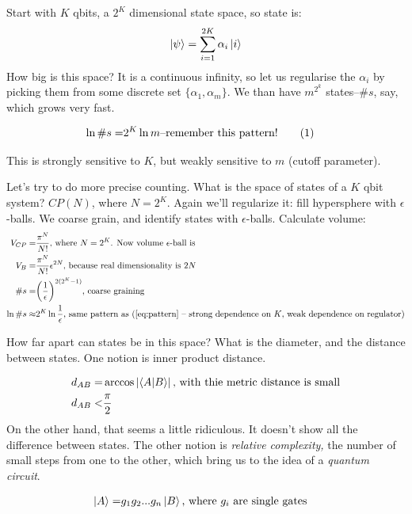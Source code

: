 \documentclass[]{article}
\newcommand\numberthis{\addtocounter{equation}{1}\tag{\theequation}}
\begin{document}
Start with $K$ qbits,  a $2^K$ dimensional state space, so state is:
\begin{align*}
	\ket{\psi}=\sum_{i=1}^{2K}\alpha_i \ket{i}
\end{align*}
How big is this space? It is a continuous infinity, so let us regularise the $\alpha_i$ by picking them from some discrete set $\{\alpha_1, \alpha_m\}$. We than have $m^{2^k}$ states--$\#s$, say, which grows very fast.

\begin{align*}
	\ln \#s =& 2^K \ln m \text{--remember this pattern!} \numberthis \label{eq:pattern}
\end{align*}

This is strongly sensitive to $K$, but weakly sensitive to $m$ (cutoff parameter).

Let's try to do more precise counting. What is the space of states of a $K$ qbit system? $CP(N)$, where $N=2^K$. Again we'll regularize it: fill hypersphere with $\epsilon$-balls. We coarse grain, and identify states with $\epsilon$-balls. Calculate volume:
\begin{align*}
	V_{CP}=& \frac{\pi^N}{N!} \text{, where $N=2^K$. Now volume $\epsilon$-ball is}\\
	V_B =& \frac{\pi^N}{N!} \epsilon^{2N} \text{, because real dimensionality is $2N$}\\
	\#s =& \bigg(\frac{1}{\epsilon}\bigg)^{2(2^K-1)} \text{, coarse graining}\\
	\ln \#s \approx & 2^K \ln \frac{1}{\epsilon} \text{, same pattern as (\ref{eq:pattern} -- strong dependence on $K$, weak dependence on regulator)}
\end{align*}

How far apart can states be in this space? What is the diameter, and the distance between states. One notion is inner product distance.

\begin{align*}
	d_{AB}=&\arccos \left|\braket{A|B}\right| \text{, with thie metric distance is small}\\
	d_{AB}<&\frac{\pi}{2}
\end{align*}
On the other hand, that seems a little ridiculous. It doesn't show all the difference between states. The other notion is \emph{relative complexity,} the number of small steps from one to the other, which bring us to the idea of a \emph{quantum circuit}.


\begin{align*}
	\ket{A} =& g_1 g_2 ... g_n \ket{B} \text{, where $g_i$ are single gates}
\end{align*}
\end{document}

